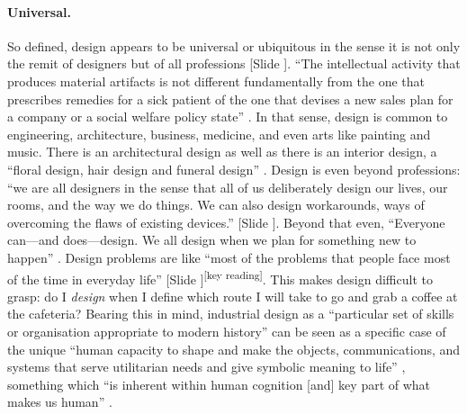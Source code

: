 \documentclass{article}
\newcounter{slide}
\begin{document}
\paragraph{Universal.} So defined, design appears to be universal or ubiquitous in the sense it is not only the remit of designers but of all professions {\color{blue}[Slide ]}. ``The intellectual activity that produces material artifacts is not different fundamentally from the one that prescribes remedies for a sick patient of the one that devises a new sales plan for a company or a social welfare policy state'' \cite[p. 111]{simon1996sciences}. In that sense, design is common to engineering, architecture, business, medicine, and even arts like painting and music. There is an architectural design as well as there is an interior design, a ``floral design, hair design and funeral design'' \cite{heskett2001past}. Design is even beyond professions: ``we are all designers in the sense that all of us deliberately design our lives, our rooms, and the way we do things. We can also design workarounds, ways of overcoming the flaws of existing devices.'' {\color{blue}[Slide ]}\cite{normanDesignEverydayThings2013}. Beyond that even, ``Everyone can---and does---design. We all design when we plan for something new to happen'' \cite{crossDesignThinkingUnderstanding2011a}. Design problems are like ``most of the problems that people face most of the time in everyday life'' {\color{blue}[Slide ]}\cite{archerDesignDiscipline1979}\textsuperscript{\color{Magenta}[key reading]}. This makes design difficult to grasp: do I \emph{design} when I define which route I will take to go and grab a coffee at the cafeteria? Bearing this in mind, industrial design as a ``particular set of skills or organisation appropriate to modern history'' can be seen as a specific case of the unique ``human capacity to shape and make the objects, communications, and systems that serve utilitarian needs and give symbolic meaning to life'' \cite{heskett2001past}, something which ``is inherent within human cognition [and] key part of what makes us human'' \cite{crossDesignThinkingUnderstanding2011a}.
\end{document}
